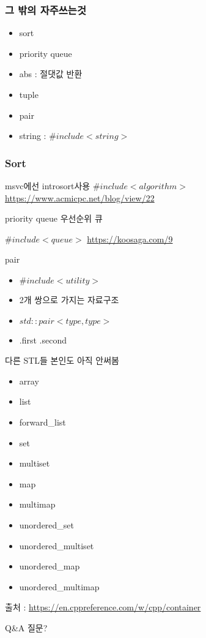 \documentclass[10pt]{beamer}
\begin{document}
\begin{frame}[fragile] 
    \frametitle{그 밖의 자주쓰는것}
    
    \begin{itemize}
        \item sort
        \item priority queue
        \item abs : 절댓값 반환
        \item tuple
        \item pair
        \item string : $\#include <string>$
    \end{itemize}
    
\end{frame}

\begin{frame}
    
    \frametitle{Sort}

    msvc에선 introsort사용
    $\#include<algorithm>$
    \url{https://www.acmicpc.net/blog/view/22}

\end{frame}

\begin{frame}{priority queue 우선순위 큐}
    
    $\#include<queue>$
    \url{https://koosaga.com/9}
    
\end{frame}

\begin{frame}{pair}

    \begin{itemize}
        \item $\#include<utility>$
        \item 2개 쌍으로 가지는 자료구조 
        \item $std::pair<type,type>$
        \item .first .second
    \end{itemize}
\end{frame}


\begin{frame}{다른 STL들}
    본인도 아직 안써봄
    \begin{itemize}
        \item array
        \item list
        \item forward\_list
        \item set
        \item multiset
        \item map
        \item multimap
        \item unordered\_set
        \item unordered\_multiset
        \item unordered\_map
        \item unordered\_multimap
    \end{itemize}

    출처 : \url{https://en.cppreference.com/w/cpp/container}

\end{frame}

\begin{frame}{Q\&A}
    질문?
\end{frame}
\end{document}
